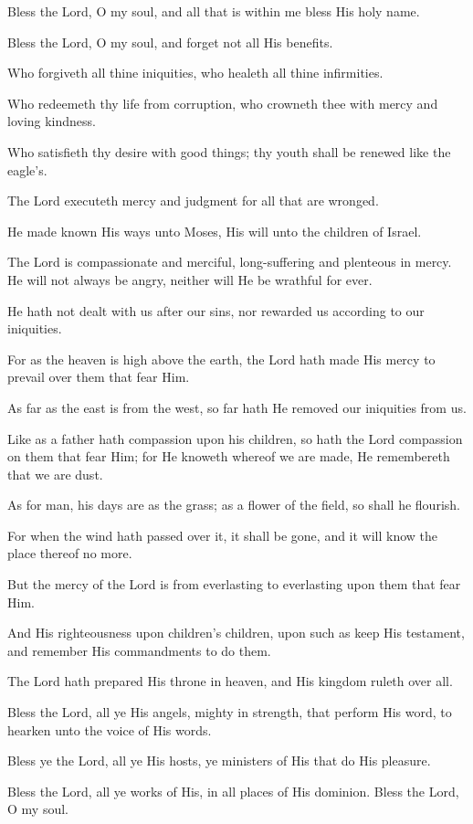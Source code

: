 Bless the Lord, O my soul, and all that is within me bless His holy name.

Bless the Lord, O my soul, and forget not all His benefits.

Who forgiveth all thine iniquities, who healeth all thine infirmities.

Who redeemeth thy life from corruption, who crowneth thee with mercy and loving kindness.

Who satisfieth thy desire with good things; thy youth shall be renewed like the eagle's.

The Lord executeth mercy and judgment for all that are wronged.

He made known His ways unto Moses, His will unto the children of Israel.

The Lord is compassionate and merciful, long-suffering and plenteous in mercy. He will not always be angry, neither will He be wrathful for ever.

He hath not dealt with us after our sins, nor rewarded us according to our iniquities.

For as the heaven is high above the earth, the Lord hath made His mercy to prevail over them that fear Him.

As far as the east is from the west, so far hath He removed our iniquities from us.

Like as a father hath compassion upon his children, so hath the Lord compassion on them that fear Him; for He knoweth whereof we are made, He remembereth that we are dust.

As for man, his days are as the grass; as a flower of the field, so shall he flourish.

For when the wind hath passed over it, it shall be gone, and it will know the place thereof no more.

But the mercy of the Lord is from everlasting to everlasting upon them that fear Him.

And His righteousness upon children's children, upon such as keep His testament, and remember His commandments to do them.

The Lord hath prepared His throne in heaven, and His kingdom ruleth over all.

Bless the Lord, all ye His angels, mighty in strength, that perform His word, to hearken unto the voice of His words.

Bless ye the Lord, all ye His hosts, ye ministers of His that do His pleasure.

Bless the Lord, all ye works of His, in all places of His dominion. Bless the Lord, O my soul.
